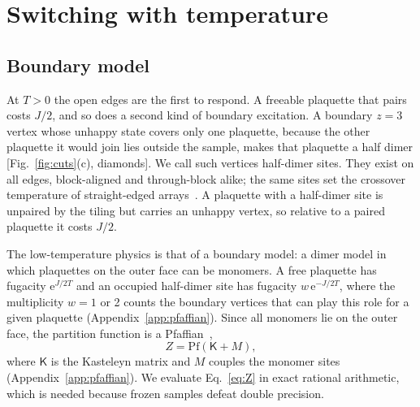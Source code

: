\documentclass[reprint,aps,prb,floatfix,longbibliography,amsmath,amssymb]{revtex4-2}
\newcommand{\ee}{\mathrm{e}}
\newcommand{\Kas}{\mathsf{K}}
\begin{document}
\section{Switching with temperature}\label{sec:switch}

\subsection{Boundary model}\label{sec:bmodel}

At $T>0$ the open edges are the first to respond. A freeable plaquette that pairs costs $J/2$, and so does a second kind of boundary excitation. A boundary $z=3$ vertex whose unhappy state covers only one plaquette, because the other plaquette it would join lies outside the sample, makes that plaquette a half dimer [Fig.~\ref{fig:cuts}(c), diamonds]. We call such vertices half-dimer sites. They exist on all edges, block-aligned and through-block alike; the same sites set the crossover temperature of straight-edged arrays~\cite{KimVorticity}. A plaquette with a half-dimer site is unpaired by the tiling but carries an unhappy vertex, so relative to a paired plaquette it costs $J/2$.

The low-temperature physics is that of a boundary model: a dimer model in which plaquettes on the outer face can be monomers. A free plaquette has fugacity $\ee^{J/2T}$ and an occupied half-dimer site has fugacity $w\,\ee^{-J/2T}$, where the multiplicity $w=1$ or 2 counts the boundary vertices that can play this role for a given plaquette (Appendix~\ref{app:pfaffian}). Since all monomers lie on the outer face, the partition function is a Pfaffian~\cite{Giuliani2016},
\begin{equation}\label{eq:Z}
  Z=\mathrm{Pf}(\Kas+M),
\end{equation}
where $\Kas$ is the Kasteleyn matrix and $M$ couples the monomer sites (Appendix~\ref{app:pfaffian}). We evaluate Eq.~\eqref{eq:Z} in exact rational arithmetic, which is needed because frozen samples defeat double precision.
\end{document}

